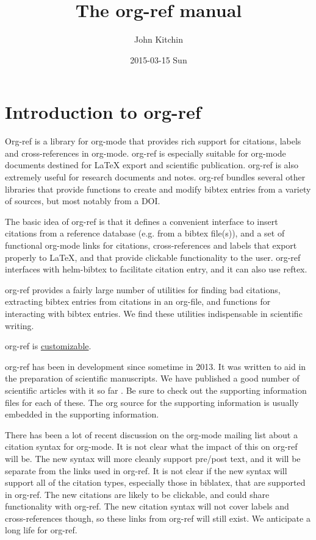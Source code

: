 \documentclass[11pt]{article}
\author{John Kitchin}
\date{2015-03-15 Sun}
\title{The org-ref manual}
\begin{document}
\maketitle
\maketitle
\tableofcontents


\section{Introduction to org-ref}
\label{sec-1}
Org-ref is a library for org-mode \cite{Dominik201408} that provides rich support for citations, labels and cross-references in org-mode. org-ref is especially suitable for org-mode documents destined for \LaTeX{} export and scientific publication. org-ref is also extremely useful for research documents and notes. org-ref bundles several other libraries that provide functions to create and modify bibtex entries from a variety of sources, but most notably from a DOI.

The basic idea of org-ref is that it defines a convenient interface to insert citations from a reference database (e.g. from a bibtex file(s)), and a set of functional org-mode links for citations, cross-references and labels that export properly to \LaTeX{}, and that provide clickable functionality to the user. org-ref interfaces with helm-bibtex to facilitate citation entry, and it can also use reftex.

org-ref provides a fairly large number of utilities for finding bad citations, extracting bibtex entries from citations in an org-file, and functions for interacting with bibtex entries. We find these utilities indispensable in scientific writing.

org-ref is \hyperref[sec-3-1]{customizable}.

org-ref has been in development since sometime in 2013. It was written to aid in the preparation of scientific manuscripts. We have published a good number of scientific articles with it so far  \cite{hallenbeck-2013-effec,mehta-2014-ident-poten,xu-2014-relat-elect,xu-2014-probin-cover,miller-2014-simul-temper,curnan-2014-effec-concen,boes-2015-estim-bulk,xu-2015-linear-respon,xu-2015-relat-between}. Be sure to check out the supporting information files for each of these. The org source for the supporting information is usually embedded in the supporting information.

There has been a lot of recent discussion on the org-mode mailing list about a citation syntax for org-mode. It is not clear what the impact of this on org-ref will be. The new syntax will more cleanly support pre/post text, and it will be separate from the links used in org-ref. It is not clear if the new syntax will support all of the citation types, especially those in biblatex, that are supported in org-ref. The new citations are likely to be clickable, and could share functionality with org-ref. The new citation syntax will not cover labels and cross-references though, so these links from org-ref will still exist. We anticipate a long life for org-ref.
\end{document}
